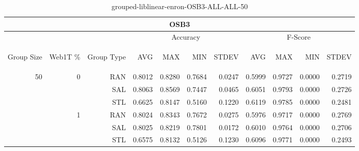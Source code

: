 \begin{center}
\begin{table}[htbp]
\begin{tabular}{ | r | r | r | r | r | r | r | r | r | r | r |}
\hline
\multicolumn{11}{|c|}{OSB3}\\
\hline
 & & & \multicolumn{4}{|c|}{Accuracy} & \multicolumn{4}{|c|}{F-Score}\\ \cline{4-11}
\begin{sideways}Group Size\end{sideways} & \begin{sideways}Web1T \%\end{sideways} & \begin{sideways}Group Type\end{sideways} & \begin{sideways}AVG\end{sideways} & \begin{sideways}MAX\end{sideways} & \begin{sideways}MIN\end{sideways} & \begin{sideways}STDEV\end{sideways} & \begin{sideways}AVG\end{sideways} & \begin{sideways}MAX\end{sideways} & \begin{sideways}MIN\end{sideways} & \begin{sideways}STDEV\end{sideways}\\
\hline
\multirow{6}{*}{50}
 & \multirow{3}{*}{0} & RAN & 0.8012 & 0.8280 & 0.7684 & 0.0247 & 0.5999 & 0.9727 & 0.0000 & 0.2719\\ \cline{3-11}
 &   & SAL & 0.8063 & 0.8569 & 0.7447 & 0.0465 & 0.6051 & 0.9793 & 0.0000 & 0.2726\\ \cline{3-11}
 &   & STL & 0.6625 & 0.8147 & 0.5160 & 0.1220 & 0.6119 & 0.9785 & 0.0000 & 0.2481\\ \cline{2-11}
 & \multirow{3}{*}{1} & RAN & 0.8024 & 0.8343 & 0.7672 & 0.0275 & 0.5976 & 0.9717 & 0.0000 & 0.2769\\ \cline{3-11}
 &   & SAL & 0.8025 & 0.8219 & 0.7801 & 0.0172 & 0.6010 & 0.9764 & 0.0000 & 0.2706\\ \cline{3-11}
 &   & STL & 0.6575 & 0.8132 & 0.5126 & 0.1230 & 0.6096 & 0.9771 & 0.0000 & 0.2493\\ \cline{2-11}
\hline
\end{tabular}
\caption{grouped-liblinear-enron-OSB3-ALL-ALL-50}
\end{table}
\end{center}

